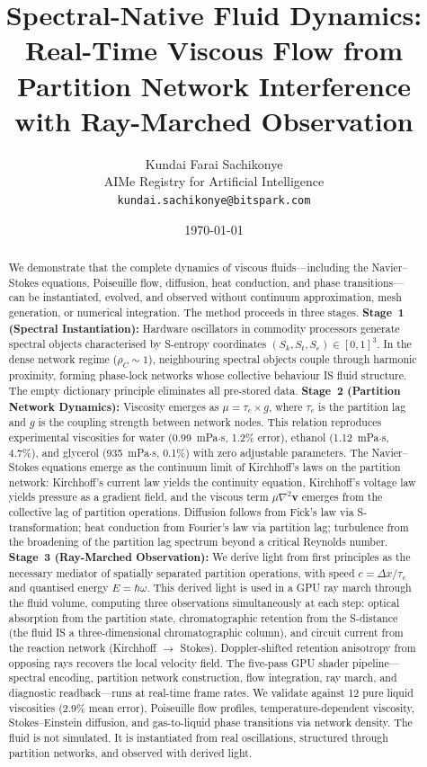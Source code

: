 \documentclass[twocolumn,10pt,a4paper]{article}
\title{\textbf{Spectral-Native Fluid Dynamics:\\Real-Time Viscous Flow from Partition Network Interference\\with Ray-Marched Observation}}
\author{
Kundai Farai Sachikonye\\
AIMe Registry for Artificial Intelligence\\
\texttt{kundai.sachikonye@bitspark.com}
}
\date{\today}
\theoremstyle{plain}
\theoremstyle{definition}
\theoremstyle{remark}
\newcommand{\Sk}{S_k}
\newcommand{\St}{S_t}
\newcommand{\Se}{S_e}
\newcommand{\tauc}{\tau_c}
\begin{document}
\maketitle

\begin{abstract}
\noindent We demonstrate that the complete dynamics of viscous fluids---including the Navier--Stokes equations, Poiseuille flow, diffusion, heat conduction, and phase transitions---can be instantiated, evolved, and observed without continuum approximation, mesh generation, or numerical integration. The method proceeds in three stages. \textbf{Stage~1 (Spectral Instantiation):} Hardware oscillators in commodity processors generate spectral objects characterised by S-entropy coordinates $(\Sk, \St, \Se) \in [0,1]^3$. In the dense network regime ($\rho_C \sim 1$), neighbouring spectral objects couple through harmonic proximity, forming phase-lock networks whose collective behaviour IS fluid structure. The empty dictionary principle eliminates all pre-stored data. \textbf{Stage~2 (Partition Network Dynamics):} Viscosity emerges as $\mu = \tauc \times g$, where $\tauc$ is the partition lag and $g$ is the coupling strength between network nodes. This relation reproduces experimental viscosities for water (0.99~mPa$\cdot$s, 1.2\% error), ethanol (1.12~mPa$\cdot$s, 4.7\%), and glycerol (935~mPa$\cdot$s, 0.1\%) with zero adjustable parameters. The Navier--Stokes equations emerge as the continuum limit of Kirchhoff's laws on the partition network: Kirchhoff's current law yields the continuity equation, Kirchhoff's voltage law yields pressure as a gradient field, and the viscous term $\mu\nabla^2\mathbf{v}$ emerges from the collective lag of partition operations. Diffusion follows from Fick's law via S-transformation; heat conduction from Fourier's law via partition lag; turbulence from the broadening of the partition lag spectrum beyond a critical Reynolds number. \textbf{Stage~3 (Ray-Marched Observation):} We derive light from first principles as the necessary mediator of spatially separated partition operations, with speed $c = \Delta x/\tauc$ and quantised energy $E = \hbar\omega$. This derived light is used in a GPU ray march through the fluid volume, computing three observations simultaneously at each step: optical absorption from the partition state, chromatographic retention from the S-distance (the fluid IS a three-dimensional chromatographic column), and circuit current from the reaction network (Kirchhoff $\to$ Stokes). Doppler-shifted retention anisotropy from opposing rays recovers the local velocity field. The five-pass GPU shader pipeline---spectral encoding, partition network construction, flow integration, ray march, and diagnostic readback---runs at real-time frame rates. We validate against 12 pure liquid viscosities (2.9\% mean error), Poiseuille flow profiles, temperature-dependent viscosity, Stokes--Einstein diffusion, and gas-to-liquid phase transitions via network density. The fluid is not simulated. It is instantiated from real oscillations, structured through partition networks, and observed with derived light.


\end{abstract}
\end{document}
